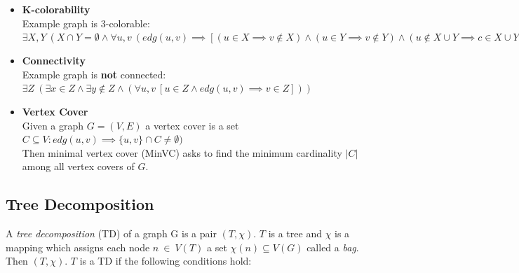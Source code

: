 \documentclass[a4paper, 12pt, bibliography=totoc]{scrartcl}
\begin{document}
\begin{itemize}
	\item \textbf{K-colorability}\\
	Example graph is 3-colorable:\\	
	$\exists X,Y~(X \cap Y = \emptyset \land \forall u,v~(edg(u,v) \implies [(u\in X \implies v\notin X)\land (u\in Y \implies v\notin Y)\land (u\notin X \cup Y \implies c \in X \cup Y)]))$
	
	\item \textbf{Connectivity}\\
	Example graph is \textbf{not} connected:\\	
	$\exists Z~(\exists x \in Z \land \exists y \notin Z \land (\forall u,v~[u\in Z \land edg(u,v) \implies v \in Z]))$
	
	\item \textbf{Vertex Cover} \cite[Ch. 4.2]{dpdbpadl2020}\\
	Given a graph $G=(V,E)$ a vertex cover is a set\\
	$C \subseteq V:edg(u,v)\implies \{u,v\}\cap C \neq \emptyset)$\\
	Then minimal vertex cover (MinVC) asks to find the minimum cardinality $|C|$ among all vertex covers of $G$. 
\end{itemize}



\subsection{Tree Decomposition}
A \textit{tree decomposition} (TD) of a graph G is a pair $(T, \chi)$. $T$ is a tree and $\chi$ is a mapping which assigns each node $n~\in~V(T)$ 
a set $\chi(n) \subseteq V(G)$ called a \textit{bag}. Then $(T, \chi)$. $T$ is a TD if the following conditions hold:
\end{document}

